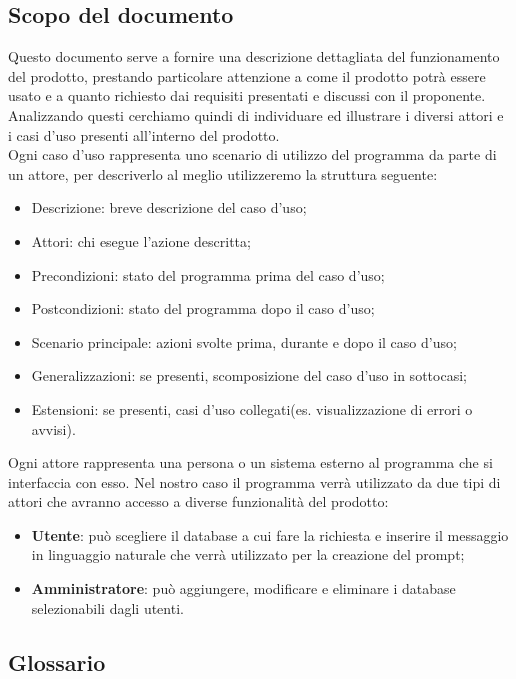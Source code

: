 \documentclass[5pt]{article}
\begin{document}
\subsection{Scopo del documento}
Questo documento serve a fornire una descrizione dettagliata del funzionamento del prodotto, prestando particolare attenzione a come il prodotto potrà essere usato e a quanto richiesto dai requisiti presentati e discussi con il proponente.
Analizzando questi cerchiamo quindi di individuare ed illustrare i diversi attori e i casi d’uso presenti all’interno del prodotto.\\
Ogni caso d’uso rappresenta uno scenario di utilizzo del programma da parte di un attore, per descriverlo al meglio utilizzeremo la struttura seguente:
\begin{itemize}
    \item Descrizione: breve descrizione del caso d'uso;
    \item Attori: chi esegue l'azione descritta;
    \item Precondizioni: stato del programma prima del caso d'uso;
    \item Postcondizioni: stato del programma dopo il caso d'uso;
    \item Scenario principale: azioni svolte prima, durante e dopo il caso d'uso;
    \item Generalizzazioni: se presenti, scomposizione del caso d'uso in sottocasi;
    \item Estensioni: se presenti, casi d'uso collegati(es. visualizzazione di errori o avvisi).
\end{itemize}
Ogni attore rappresenta una persona o un sistema esterno al programma che si interfaccia con esso.
Nel nostro caso il programma verrà utilizzato da due tipi di attori che avranno accesso a diverse funzionalità del prodotto:
\begin{itemize}
    \item \textbf{Utente}: può scegliere il database a cui fare la richiesta e inserire il messaggio in linguaggio naturale che verrà utilizzato per la creazione del prompt;
    \item \textbf{Amministratore}: può aggiungere, modificare e eliminare i database selezionabili dagli utenti.
\end{itemize} %

\subsection{Glossario}
\end{document}
